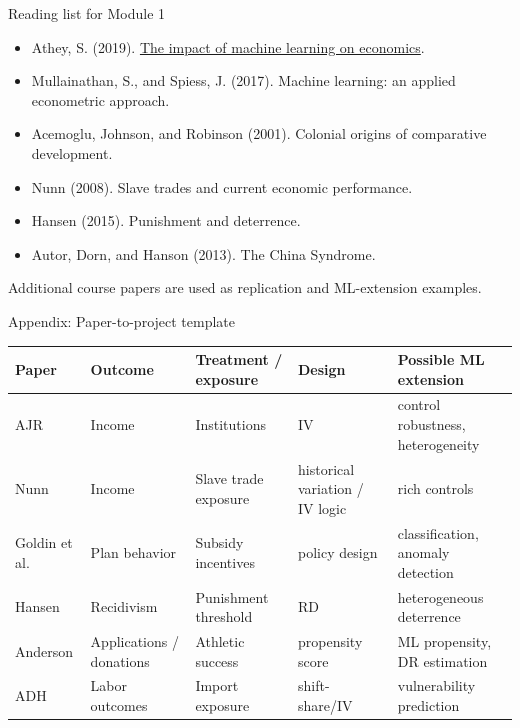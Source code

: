 \documentclass[aspectratio=169,11pt]{beamer}
\newcommand{\smallcite}[1]{{\scriptsize \textcolor{WLUGray}{#1}}}
\begin{document}
\begin{frame}{Reading list for Module 1}
\begin{itemize}
  \item Athey, S. (2019). \href{https://www.nber.org/chapters/c14009}{The impact of machine learning on economics}.
  \item Mullainathan, S., and Spiess, J. (2017). Machine learning: an applied econometric approach.
  \item Acemoglu, Johnson, and Robinson (2001). Colonial origins of comparative development.
  \item Nunn (2008). Slave trades and current economic performance.
  \item Hansen (2015). Punishment and deterrence.
  \item Autor, Dorn, and Hanson (2013). The China Syndrome.
\end{itemize}
\smallcite{Additional course papers are used as replication and ML-extension examples.}
\end{frame}

\begin{frame}{Appendix: Paper-to-project template}
\begin{center}
\scriptsize
\begin{tabular}{p{}p{}p{}p{}p{}}
\toprule
Paper & Outcome & Treatment / exposure & Design & Possible ML extension \\
\midrule
AJR & Income & Institutions & IV & control robustness, heterogeneity \\
Nunn & Income & Slave trade exposure & historical variation / IV logic & rich controls \\
Goldin et al. & Plan behavior & Subsidy incentives & policy design & classification, anomaly detection \\
Hansen & Recidivism & Punishment threshold & RD & heterogeneous deterrence \\
Anderson & Applications / donations & Athletic success & propensity score & ML propensity, DR estimation \\
ADH & Labor outcomes & Import exposure & shift-share/IV & vulnerability prediction \\
\bottomrule
\end{tabular}
\end{center}
\end{frame}
\end{document}
